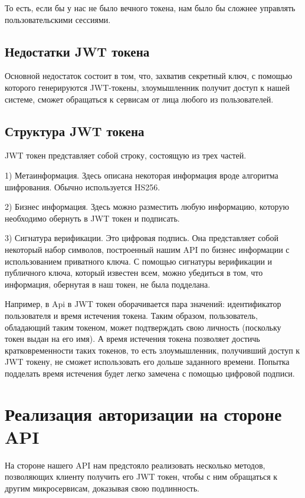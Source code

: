 \documentclass[14pt]{extarticle}
\begin{document}
    То есть, если бы у нас не было вечного токена, нам было бы сложнее управлять пользовательскими сессиями.

    \subsection{Недостатки JWT токена}
    Основной недостаток состоит в том, что, захватив секретный ключ, с помощью которого генерируются JWT-токены,
    злоумышленник получит доступ к нашей системе, сможет обращаться к сервисам от лица любого из пользователей.

    \subsection{Структура JWT токена}

    JWT токен представляет собой строку, состоящую из трех частей.

    1) Метаинформация.
    Здесь описана некоторая информация вроде алгоритма шифрования.
    Обычно используется HS256.

    2) Бизнес информация.
    Здесь можно разместить любую информацию, которую необходимо обернуть в JWT токен и подписать.

    3) Сигнатура верификации.
    Это цифровая подпись. Она представляет собой некоторый набор символов, построенный нашим API по бизнес
    информации с использованием приватного ключа. С помощью сигнатуры верификации и публичного ключа, который
    известен всем, можно убедиться в том, что информация, обернутая в наш токен, не была подделана.

    Например, в Api в JWT токен оборачивается пара значений: идентификатор пользователя и время истечения токена.
    Таким образом,
    пользователь, обладающий таким токеном, может подтверждать свою личность
    (поскольку токен выдан на его имя). А время истечения токена позволяет достичь кратковременности таких
    токенов, то есть злоумышленник, получивший доступ к JWT токену, не сможет использовать его дольше заданного
    времени.
    Попытка подделать время истечения будет легко замечена с помощью цифровой подписи.

    \section{Реализация авторизации на стороне API}

    На стороне нашего API нам предстояло реализовать несколько методов, позволяющих клиенту получить его JWT токен,
    чтобы с ним обращаться к другим микросервисам, доказывая свою подлинность.
\end{document}
